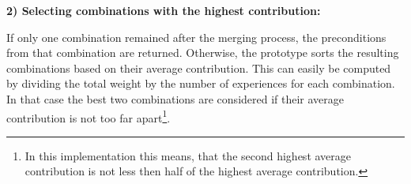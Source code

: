 %	

\textbf{2) Selecting combinations with the highest contribution:}

If only one combination remained after the merging process, the preconditions from that combination are returned. 
Otherwise, the prototype sorts the resulting combinations based on their average contribution. This can easily be computed by dividing the total weight by the number of experiences for each combination.
In that case the best two combinations are considered if their average contribution is not too far apart\footnote{In this implementation this means, that the second highest average contribution is not less then half of the highest average contribution.}.

